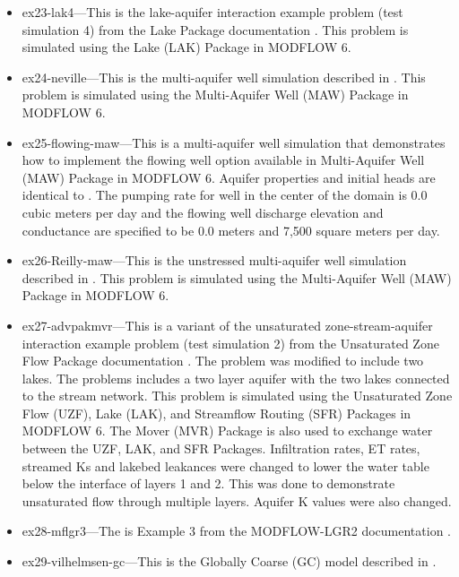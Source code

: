 \begin{itemize}
\item ex23-lak4---This is the lake-aquifer interaction example problem (test simulation 4) from the Lake Package documentation \citep{modflowlak3pack}.  This problem is simulated using the Lake (LAK) Package in MODFLOW 6.

\item ex24-neville---This is the multi-aquifer well simulation described in \cite{nevilletonkin2004}.  This problem is simulated using the Multi-Aquifer Well (MAW) Package in MODFLOW 6.

\item ex25-flowing-maw---This is a multi-aquifer well simulation that demonstrates how to implement the flowing well option available in Multi-Aquifer Well (MAW) Package in MODFLOW 6. Aquifer properties and initial heads are identical to \cite{nevilletonkin2004}.  The pumping rate for well in the center of the domain is 0.0 cubic meters per day and the flowing well discharge elevation and conductance are specified to be 0.0 meters and 7,500 square meters per day.

\item ex26-Reilly-maw---This is the unstressed multi-aquifer well simulation described in \cite{reilly1989bias}.  This problem is simulated using the Multi-Aquifer Well (MAW) Package in MODFLOW 6.

\item ex27-advpakmvr---This is a variant of the unsaturated zone-stream-aquifer interaction example problem (test simulation 2) from the Unsaturated Zone Flow Package documentation \citep{UZF}.  The problem was modified to include two lakes.  The problems includes a two layer aquifer with the two lakes connected to the stream network.  This problem is simulated using the Unsaturated Zone Flow (UZF), Lake (LAK), and Streamflow Routing (SFR) Packages in MODFLOW 6. The Mover (MVR) Package is also used to exchange water between the UZF, LAK, and SFR Packages. Infiltration rates, ET rates, streamed Ks and lakebed leakances were changed to lower the water table below the interface of layers 1 and 2. This was done to demonstrate unsaturated flow through multiple layers. Aquifer K values were also changed.

\item ex28-mflgr3---The is Example 3 from the MODFLOW-LGR2 documentation \citep{mehl2013modflow}.

\item ex29-vilhelmsen-gc---This is the Globally Coarse (GC) model described in \cite{vilhelmsen2012evaluation}.


\end{itemize}
